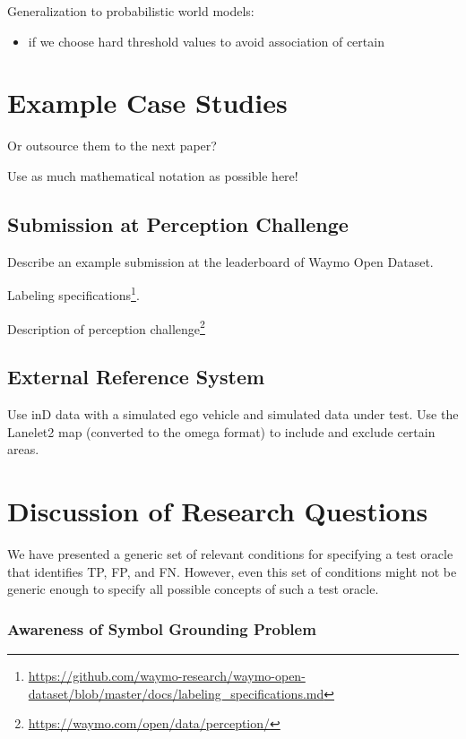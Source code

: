 \documentclass[conference]{IEEEtran}
\begin{document}
Generalization to probabilistic world models: 
\begin{itemize}
\item if we choose hard threshold values to avoid association of certain 
\end{itemize}


\section{Example Case Studies}

Or outsource them to the next paper?

Use as much mathematical notation as possible here!

\subsection{Submission at Perception Challenge}

Describe an example submission at the leaderboard of Waymo Open Dataset. 

Labeling specifications\footnote{\url{https://github.com/waymo-research/waymo-open-dataset/blob/master/docs/labeling_specifications.md}}.

Description of perception challenge\footnote{\url{https://waymo.com/open/data/perception/}}


\subsection{External Reference System}

Use inD data with a simulated ego vehicle and simulated data under test.
Use the Lanelet2 map (converted to the omega format) to include and exclude certain areas.


\section{Discussion of Research Questions}
\label{sec:discussion}

We have presented a generic set of relevant conditions for specifying a test oracle that identifies TP, FP, and FN. 
However, even this set of conditions might not be generic enough to specify all possible concepts of such a test oracle. 


\subsubsection{Awareness of Symbol Grounding Problem}
\end{document}
